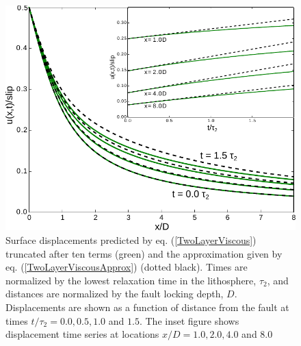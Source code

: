 \documentclass[extra,mreferee]{gji}
\begin{document}
\begin{figure}\label{figure1}
  \centering 
  \includegraphics[scale=0.8]{FinalFigures/Figure1.pdf}
  \caption{Surface displacements predicted by
    eq. (\ref{TwoLayerViscous}) truncated after ten terms (green) and
    the approximation given by eq. (\ref{TwoLayerViscousApprox})
    (dotted black).  Times are normalized by the lowest relaxation
    time in the lithosphere, $\tau_2$, and distances are normalized by
    the fault locking depth, $D$.  Displacements are shown as a
    function of distance from the fault at times $t/\tau_2 =
    0.0,0.5,1.0$ and $1.5$. The inset figure shows displacement time
    series at locations $x/D = 1.0, 2.0, 4.0$ and $8.0$}
  \label{Figure 1}
\end{figure} 
\end{document}
